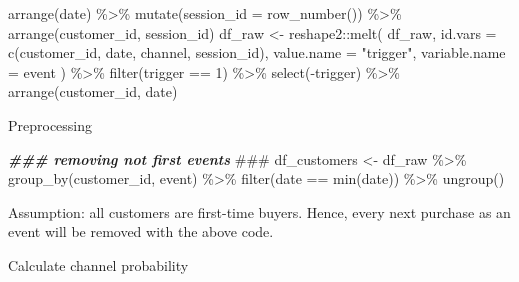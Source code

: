 \documentclass[
]{book}
\newenvironment{Shaded}{\begin{snugshade}}{\end{snugshade}}
\newcommand{\AlertTok}[1]{\textcolor[rgb]{0.94,0.16,0.16}{#1}}
\newcommand{\AttributeTok}[1]{\textcolor[rgb]{0.77,0.63,0.00}{#1}}
\newcommand{\DecValTok}[1]{\textcolor[rgb]{0.00,0.00,0.81}{#1}}
\newcommand{\DocumentationTok}[1]{\textcolor[rgb]{0.56,0.35,0.01}{\textbf{\textit{#1}}}}
\newcommand{\FunctionTok}[1]{\textcolor[rgb]{0.00,0.00,0.00}{#1}}
\newcommand{\NormalTok}[1]{#1}
\newcommand{\OtherTok}[1]{\textcolor[rgb]{0.56,0.35,0.01}{#1}}
\newcommand{\SpecialCharTok}[1]{\textcolor[rgb]{0.00,0.00,0.00}{#1}}
\newcommand{\StringTok}[1]{\textcolor[rgb]{0.31,0.60,0.02}{#1}}
\begin{document}
\begin{Shaded}
\begin{Highlighting}[]
  \FunctionTok{arrange}\NormalTok{(date) }\SpecialCharTok{\%\textgreater{}\%}
  \FunctionTok{mutate}\NormalTok{(}\AttributeTok{session\_id =} \FunctionTok{row\_number}\NormalTok{()) }\SpecialCharTok{\%\textgreater{}\%}
  \FunctionTok{arrange}\NormalTok{(customer\_id, session\_id)}
\NormalTok{df\_raw }\OtherTok{\textless{}{-}}
\NormalTok{  reshape2}\SpecialCharTok{::}\FunctionTok{melt}\NormalTok{(}
\NormalTok{    df\_raw,}
    \AttributeTok{id.vars =} \FunctionTok{c}\NormalTok{(}\StringTok{\textquotesingle{}customer\_id\textquotesingle{}}\NormalTok{, }\StringTok{\textquotesingle{}date\textquotesingle{}}\NormalTok{, }\StringTok{\textquotesingle{}channel\textquotesingle{}}\NormalTok{, }\StringTok{\textquotesingle{}session\_id\textquotesingle{}}\NormalTok{),}
    \AttributeTok{value.name =} \StringTok{"trigger"}\NormalTok{,}
    \AttributeTok{variable.name =} \StringTok{\textquotesingle{}event\textquotesingle{}}
\NormalTok{  ) }\SpecialCharTok{\%\textgreater{}\%}
  \FunctionTok{filter}\NormalTok{(trigger }\SpecialCharTok{==} \DecValTok{1}\NormalTok{) }\SpecialCharTok{\%\textgreater{}\%}
  \FunctionTok{select}\NormalTok{(}\SpecialCharTok{{-}}\NormalTok{trigger) }\SpecialCharTok{\%\textgreater{}\%}
  \FunctionTok{arrange}\NormalTok{(customer\_id, date)}
\end{Highlighting}
\end{Shaded}

Preprocessing

\begin{Shaded}
\begin{Highlighting}[]
\DocumentationTok{\#\#\# removing not first events }\AlertTok{\#\#\#}
\NormalTok{df\_customers }\OtherTok{\textless{}{-}}\NormalTok{ df\_raw }\SpecialCharTok{\%\textgreater{}\%}
  \FunctionTok{group\_by}\NormalTok{(customer\_id, event) }\SpecialCharTok{\%\textgreater{}\%}
  \FunctionTok{filter}\NormalTok{(date }\SpecialCharTok{==} \FunctionTok{min}\NormalTok{(date)) }\SpecialCharTok{\%\textgreater{}\%}
  \FunctionTok{ungroup}\NormalTok{()}
\end{Highlighting}
\end{Shaded}

Assumption: all customers are first-time buyers. Hence, every next purchase as an event will be removed with the above
code.

Calculate channel probability
\end{document}
